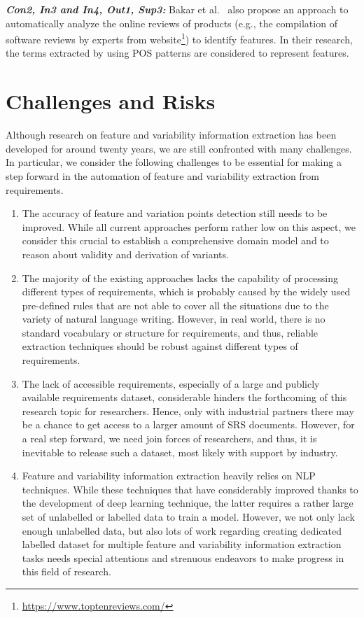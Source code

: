 \documentclass[graybox]{svmult}
\begin{document}
\noindent\textbf{\textit{Con2, In3 and In4, Out1, Sup3:}} Bakar et al.~\cite{BakarKSJ16} also propose an approach to automatically analyze the online reviews of products (e.g., the compilation of software reviews by experts from website\footnote{\url{https://www.toptenreviews.com/}}) to identify features. In their research, the terms extracted by using POS patterns are considered to represent features.

\section{Challenges and Risks}
\label{sec:challenge}
Although research on feature and variability information extraction has been developed for around twenty years, we are still confronted with many challenges. In particular, we consider the following challenges to be essential for making a step forward in the automation of feature and variability extraction from requirements.
\begin{enumerate}
\item The accuracy of feature and variation points detection still needs to be improved. While all current approaches perform rather low on this aspect, we consider this crucial to establish a comprehensive domain model and to reason about validity and derivation of variants.
\item The majority of the existing approaches lacks the capability of processing different types of requirements, which is probably caused by the widely used pre-defined rules that are not able to cover all the situations due to the variety of natural language writing. However, in real world, there is no standard vocabulary or structure for requirements, and thus, reliable extraction techniques should be robust against different types of requirements.
\item The lack of accessible requirements, especially of a large and publicly available requirements dataset, considerable hinders the forthcoming of this research topic for researchers. Hence, only with industrial partners there may be a chance to get access to a larger amount of SRS documents. However, for a real step forward, we need join forces of researchers, and thus, it is inevitable to release such a dataset, most likely with support by industry.
\item Feature and variability information extraction heavily relies on NLP techniques. While these techniques that have considerably improved thanks to the development of deep learning technique, the latter requires a rather large set of unlabelled or labelled data to train a model. However, we not only lack enough unlabelled data, but also lots of work regarding creating dedicated labelled dataset for multiple feature and variability information extraction tasks needs special attentions and strenuous endeavors to make progress in this field of research. 
\end{enumerate}
\end{document}
